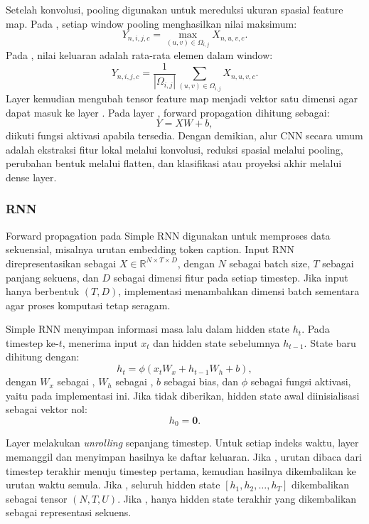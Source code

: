 Setelah konvolusi, pooling digunakan untuk mereduksi ukuran spasial feature map.
Pada , setiap window pooling menghasilkan nilai maksimum:
\[
Y_{n,i,j,c} = \max_{(u,v) \in \Omega_{i,j}} X_{n,u,v,c}.
\]
Pada , nilai keluaran adalah rata-rata elemen dalam
window:
\[
Y_{n,i,j,c} = \frac{1}{|\Omega_{i,j}|}
\sum_{(u,v) \in \Omega_{i,j}} X_{n,u,v,c}.
\]
Layer  kemudian mengubah tensor feature map menjadi vektor satu
dimensi agar dapat masuk ke layer . Pada layer , forward
propagation dihitung sebagai:
\[
Y = XW + b,
\]
diikuti fungsi aktivasi apabila tersedia. Dengan demikian, alur CNN secara
umum adalah ekstraksi fitur lokal melalui konvolusi, reduksi spasial melalui
pooling, perubahan bentuk melalui flatten, dan klasifikasi atau proyeksi akhir
melalui dense layer.

\subsubsection{RNN}
Forward propagation pada Simple RNN digunakan untuk memproses data sekuensial,
misalnya urutan embedding token caption. Input RNN direpresentasikan sebagai
$X \in \mathbb{R}^{N \times T \times D}$, dengan $N$ sebagai batch size,
$T$ sebagai panjang sekuens, dan $D$ sebagai dimensi fitur pada setiap timestep.
Jika input hanya berbentuk $(T,D)$, implementasi menambahkan dimensi batch
sementara agar proses komputasi tetap seragam.

Simple RNN menyimpan informasi masa lalu dalam hidden state $h_t$. Pada timestep
ke-$t$,  menerima input $x_t$ dan hidden state sebelumnya
$h_{t-1}$. State baru dihitung dengan:
\[
h_t = \phi(x_t W_x + h_{t-1} W_h + b),
\]
dengan $W_x$ sebagai , $W_h$ sebagai ,
$b$ sebagai bias, dan $\phi$ sebagai fungsi aktivasi, yaitu  pada
implementasi ini. Jika  tidak diberikan, hidden state awal
diinisialisasi sebagai vektor nol:
\[
h_0 = \mathbf{0}.
\]

Layer  melakukan \textit{unrolling} sepanjang timestep. Untuk
setiap indeks waktu, layer memanggil  dan
menyimpan hasilnya ke daftar keluaran. Jika , urutan
dibaca dari timestep terakhir menuju timestep pertama, kemudian hasilnya
dikembalikan ke urutan waktu semula. Jika , seluruh
hidden state $[h_1, h_2, \ldots, h_T]$ dikembalikan sebagai tensor
$(N,T,U)$. Jika , hanya hidden state terakhir yang
dikembalikan sebagai representasi sekuens.

